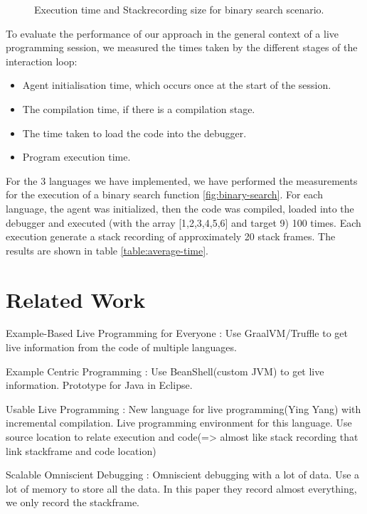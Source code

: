 \documentclass[english,submission]{programming}
\begin{document}
\begin{figure}[htbp]
  \caption{Execution time and Stackrecording size for binary search scenario.}
  \label{fig:scenario-bs}
\end{figure}

To evaluate the performance of our approach in the general context of a live programming session, we measured the times taken by the different stages of the interaction loop:

\begin{itemize}
  \item Agent initialisation time, which occurs once at the start of the session.
  \item The compilation time, if there is a compilation stage.
  \item The time taken to load the code into the debugger.
  \item Program execution time.
\end{itemize}

For the 3 languages we have implemented, we have performed the measurements for the execution of a binary search function \ref{fig:binary-search}.
For each language, the agent was initialized, then the code was compiled, loaded into the debugger and executed (with the array [1,2,3,4,5,6] and target 9) 100 times.
Each execution generate a stack recording of approximately 20 stack frames.
The results are shown in table \ref{table:average-time}.





\section{Related Work}
\label{sec:related-work}

Example-Based Live Programming for Everyone\cite{10.1145/3426428.3426919} : Use GraalVM/Truffle to get live information from the code of multiple languages.

Example Centric Programming\cite{10.1145/1052883.1052894} : Use BeanShell(custom JVM) to get live information. Prototype for Java in Eclipse.

Usable Live Programming\cite{10.1145/2509578.2509585} : New language for live programming(Ying Yang) with incremental compilation. Live programming environment for this language.
Use source location to relate execution and code(=> almost like stack recording that link stackframe and code location)

Scalable Omniscient Debugging\cite{10.1145/1297105.1297067} : Omniscient debugging with a lot of data. Use a lot of memory to store all the data.
In this paper they record almost everything, we only record the stackframe.
\end{document}
